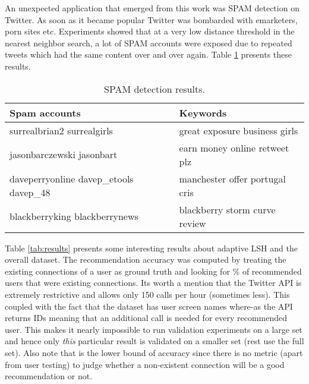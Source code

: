 \documentclass{article}
\begin{document}
An unexpected application that emerged from this work was SPAM detection on Twitter. As soon
as it became popular Twitter was bombarded with emarketers, porn sites etc. Experiments showed
that at a very low distance threshold in the nearest neighbor search, a lot of SPAM accounts were
exposed due to repeated tweets which had the same content over and over again. Table \ref{tab:spam}
presents these results.

\begin{table}
    \begin{center}
     \begin{tabular}{ | l | p{4cm}  | }
     \hline
     \textbf{Spam accounts} & \textbf{Keywords}   \\ \hline
     surrealbrian2 surrealgirls & great exposure business girls  \\ \hline
     jasonbarczewski jasonbart & earn money online retweet plz  \\ \hline
     daveperryonline davep\_etools davep\_48 &  manchester offer portugal cris  \\ \hline
     blackberryking blackberrynews & blackberry storm curve review   \\ \hline
     \end{tabular}
     \caption{SPAM detection results.}
     \label{tab:spam}
     \end{center}
\end{table}


Table \ref{tab:results} presents some interesting results about adaptive LSH and the overall
dataset. The recommendation accuracy was computed by treating the existing connections of a 
user as ground truth and looking for \% of recommended users that were existing connections.
Its worth a mention that the Twitter API is extremely restrictive and allows only 150 calls
per hour (sometimes less). This coupled with the fact that the dataset has user screen names
where-as the API returns IDs meaning that an additional call is needed for every recommended
user. This makes it nearly impossible to run validation experiments on a large set and hence only \textit{this}
particular result is validated on a smaller set (rest use the full set). Also note that is the lower bound of accuracy
since there is no metric (apart from user testing) to judge whether a non-existent connection
will be a good recommendation or not.
\end{document}

